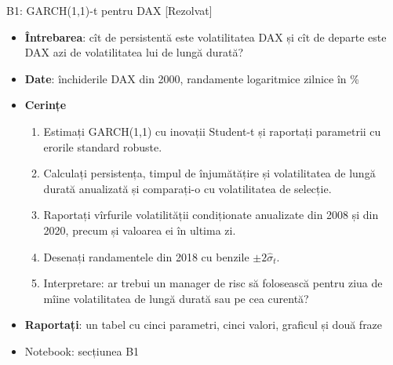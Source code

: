 \begin{frame}{B1: GARCH(1,1)-t pentru DAX [Rezolvat]}
\itemsize{\footnotesize}
\begin{itemize}
\item \textbf{Întrebarea}: cît de persistentă este volatilitatea DAX și cît de departe este DAX azi de volatilitatea lui de lungă durată?
\item \textbf{Date}: închiderile DAX din 2000, randamente logaritmice zilnice în \%
\item \textbf{Cerințe}
\begin{enumerate}
    \item Estimați GARCH(1,1) cu inovații Student-t și raportați parametrii cu erorile standard robuste.
    \item Calculați persistența, timpul de înjumătățire și volatilitatea de lungă durată anualizată și comparați-o cu volatilitatea de selecție.
    \item Raportați vîrfurile volatilității condiționate anualizate din 2008 și din 2020, precum și valoarea ei în ultima zi.
    \item Desenați randamentele din 2018 cu benzile $\pm 2\hat\sigma_t$.
    \item Interpretare: ar trebui un manager de risc să folosească pentru ziua de mîine volatilitatea de lungă durată sau pe cea curentă?
\end{enumerate}
\item \textbf{Raportați}: un tabel cu cinci parametri, cinci valori, graficul și două fraze
\item Notebook: secțiunea B1
\end{itemize}
\end{frame}

